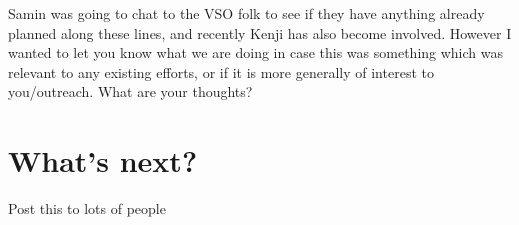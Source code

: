 \documentclass{article}
\begin{document}
Samin was going to chat to the VSO folk to see if they have anything
already planned along these lines, and recently Kenji has also become
involved. However I wanted to let you know what we are doing in case
this was something which was relevant to any existing efforts, or if
it is more generally of interest to you/outreach. What are your
thoughts?


\section{What's next?}

Post this to lots of people




%
\end{document}
